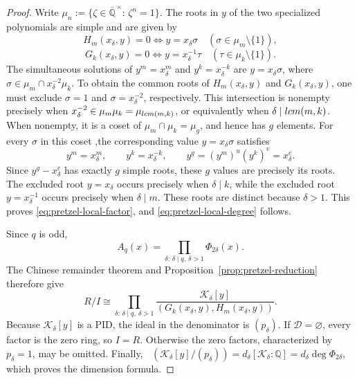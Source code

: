 \documentclass[10pt,a4paper]{amsart}
\newcommand{\Q}{{\mathbb{Q}}}
\DeclareMathOperator{\dimQ}{dim_{\Q}}
\newcommand{\lcm}{{\rm lcm}}
\begin{document}
\begin{proof}
Write \(\mu_n:=\{\zeta\in\overline{\Q}^{\,\times}:\,\zeta^n=1\}\).
The roots in \(y\) of the two specialized polynomials are simple and are
given by
\[
H_m(x_\delta,y)=0
\iff y=x_\delta\sigma
\quad(\sigma\in\mu_m\setminus\{1\}),
\]
\[
G_k(x_\delta,y)=0
\iff y=x_\delta^{-1}\tau
\quad(\tau\in\mu_k\setminus\{1\}).
\]
The simultaneous solutions of \(y^m=x_\delta^m\) and
\(y^k=x_\delta^{-k}\) are \(y=x_\delta\sigma\), where
\(\sigma\in\mu_m\cap x_\delta^{-2}\mu_k\).
To obtain the common roots of \(H_m(x_\delta,y)\) and
\(G_k(x_\delta,y)\), one must exclude
\(\sigma=1\) and \(\sigma=x_\delta^{-2}\), respectively.
This intersection is nonempty precisely when
\(x_\delta^{-2}\in\mu_m\mu_k=\mu_{\lcm(m,k)}\), or equivalently when
\(\delta\mid\lcm(m,k)\).  When nonempty, it is a
coset of \(\mu_m\cap\mu_k=\mu_g\), and hence has \(g\) elements.
For every \(\sigma\) in this coset ,the corresponding value \(y=x_\delta\sigma\) satisfies
\[
y^m=x_\delta^m,
\qquad
y^k=x_\delta^{-k},
\qquad
y^g=(y^m)^u(y^k)^v=x_\delta^e.
\]
Since \(y^g-x_\delta^e\) has exactly \(g\) simple roots, these \(g\)
values are precisely its roots.  The excluded root \(y=x_\delta\) occurs
precisely when \(\delta\mid k\), while the excluded root
\(y=x_\delta^{-1}\) occurs precisely when \(\delta\mid m\).  These roots
are distinct because \(\delta>1\).  This proves
\eqref{eq:pretzel-local-factor}, and
\eqref{eq:pretzel-local-degree} follows.

Since \(q\) is odd,
\[
A_q(x)=\prod_{\delta:\,\delta\mid q,\ \delta>1}\Phi_{2\delta}(x).
\]
The Chinese remainder theorem and
Proposition~\ref{prop:pretzel-reduction} therefore give
\[
R/I\cong
\prod_{\delta:\,\delta\mid q,\ \delta>1}
\frac{\mathcal K_\delta[y]}{(G_k(x_\delta,y),H_m(x_\delta,y))}.
\]
Because \(\mathcal K_\delta[y]\) is a PID, the ideal in the denominator
is \((p_\delta)\).  If \(\mathcal D=\varnothing\), every factor is the
zero ring, so \(I=R\).  Otherwise the zero factors, characterized by
\(p_\delta=1\), may be omitted.  Finally,
\(\dimQ(\mathcal K_\delta[y]/(p_\delta))
=d_\delta[\mathcal K_\delta:\Q]=d_\delta\deg\Phi_{2\delta}\), which
proves the dimension formula.
\end{proof}
\end{document}
